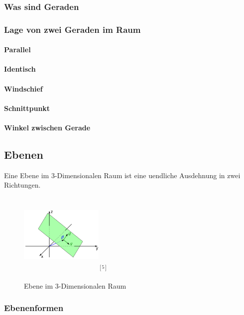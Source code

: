 \documentclass[a4paper]{article} %
\begin{document}
	\subsubsection{Was sind Geraden}
	\subsubsection{Lage von zwei Geraden im Raum}
	\paragraph{Parallel}
	\paragraph{Identisch}	
	\paragraph{Windschief}
	\paragraph{Schnittpunkt}
	\paragraph{Winkel zwischen Gerade}
	\subsection{Ebenen}
	Eine Ebene im 3-Dimensionalen Raum ist eine uendliche Ausdehnung in zwei Richtungen.
	\begin{figure}[H]
				\includegraphics[width=150px, height=150px]{Ebene.png}$^{[5]}$
					\captionsetup{labelformat=empty}
				\caption{Ebene im 3-Dimensionalen Raum}
	\end{figure}
	\subsubsection{Ebenenformen}
\end{document}
